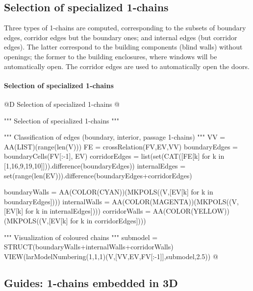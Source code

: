 \documentclass[11pt,oneside]{article}    %
\begin{document}
\subsection{Selection of specialized 1-chains}

Three types of 1-chains are computed, corresponding to the subsets of boundary edges, corridor edges but the boundary ones; and  internal edges (but corridor edges). The latter correspond to the building components (blind walls) without openings; the former to the building enclosures, where windows will be automatically open. The corridor edges are used to automatically open the doors.

\paragraph{Selection of specialized 1-chains}
@D Selection of specialized 1-chains
@{""" Selection of specialized 1-chains """

""" Classification of edges (boundary, interior, passage 1-chains) """
VV = AA(LIST)(range(len(V)))
FE = crossRelation(FV,EV,VV)
boundaryEdges = boundaryCells(FV[:-1], EV)
corridorEdges = list(set(CAT([FE[k] for k in [1,16,9,19,10]])).difference(boundaryEdges))
internalEdges = set(range(len(EV))).difference(boundaryEdges+corridorEdges)

boundaryWalls = AA(COLOR(CYAN))(MKPOLS((V,[EV[k] for k in boundaryEdges])))
internalWalls = AA(COLOR(MAGENTA))(MKPOLS((V,[EV[k] for k in internalEdges])))
corridorWalls = AA(COLOR(YELLOW))(MKPOLS((V,[EV[k] for k in corridorEdges])))

""" Visualization of coloured chains """
submodel = STRUCT(boundaryWalls+internalWalls+corridorWalls)
VIEW(larModelNumbering(1,1,1)(V,[VV,EV,FV[:-1]],submodel,2.5))
@}

\subsection{Guides: 1-chains embedded in 3D}
\end{document}
